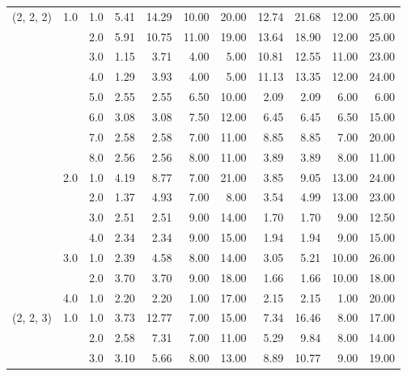 \begin{tabular}{lllrrrrrrrr}
(2, 2, 2) & 1.0 & 1.0  &       5.41 &     14.29 & 10.00 &  20.00 &      12.74 &     21.68 & 12.00 &  25.00 \\
          &     & 2.0  &       5.91 &     10.75 & 11.00 &  19.00 &      13.64 &     18.90 & 12.00 &  25.00 \\
          &     & 3.0  &       1.15 &      3.71 &  4.00 &   5.00 &      10.81 &     12.55 & 11.00 &  23.00 \\
          &     & 4.0  &       1.29 &      3.93 &  4.00 &   5.00 &      11.13 &     13.35 & 12.00 &  24.00 \\
          &     & 5.0  &       2.55 &      2.55 &  6.50 &  10.00 &       2.09 &      2.09 &  6.00 &   6.00 \\
          &     & 6.0  &       3.08 &      3.08 &  7.50 &  12.00 &       6.45 &      6.45 &  6.50 &  15.00 \\
          &     & 7.0  &       2.58 &      2.58 &  7.00 &  11.00 &       8.85 &      8.85 &  7.00 &  20.00 \\
          &     & 8.0  &       2.56 &      2.56 &  8.00 &  11.00 &       3.89 &      3.89 &  8.00 &  11.00 \\
          & 2.0 & 1.0  &       4.19 &      8.77 &  7.00 &  21.00 &       3.85 &      9.05 & 13.00 &  24.00 \\
          &     & 2.0  &       1.37 &      4.93 &  7.00 &   8.00 &       3.54 &      4.99 & 13.00 &  23.00 \\
          &     & 3.0  &       2.51 &      2.51 &  9.00 &  14.00 &       1.70 &      1.70 &  9.00 &  12.50 \\
          &     & 4.0  &       2.34 &      2.34 &  9.00 &  15.00 &       1.94 &      1.94 &  9.00 &  15.00 \\
          & 3.0 & 1.0  &       2.39 &      4.58 &  8.00 &  14.00 &       3.05 &      5.21 & 10.00 &  26.00 \\
          &     & 2.0  &       3.70 &      3.70 &  9.00 &  18.00 &       1.66 &      1.66 & 10.00 &  18.00 \\
          & 4.0 & 1.0  &       2.20 &      2.20 &  1.00 &  17.00 &       2.15 &      2.15 &  1.00 &  20.00 \\
(2, 2, 3) & 1.0 & 1.0  &       3.73 &     12.77 &  7.00 &  15.00 &       7.34 &     16.46 &  8.00 &  17.00 \\
          &     & 2.0  &       2.58 &      7.31 &  7.00 &  11.00 &       5.29 &      9.84 &  8.00 &  14.00 \\
          &     & 3.0  &       3.10 &      5.66 &  8.00 &  13.00 &       8.89 &     10.77 &  9.00 &  19.00 \\

\end{tabular}
